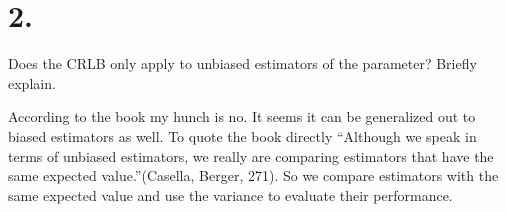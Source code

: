 \section*{2.}

Does the CRLB only apply to unbiased estimators of the parameter? Briefly explain.

According to the book my hunch is no. It seems it can be generalized out to biased estimators as well. To quote the book directly ``Although we speak in terms of unbiased estimators, we really are comparing estimators that have the same expected value.''(Casella, Berger, 271). So we compare estimators with the same expected value and use the variance to evaluate their performance. 
